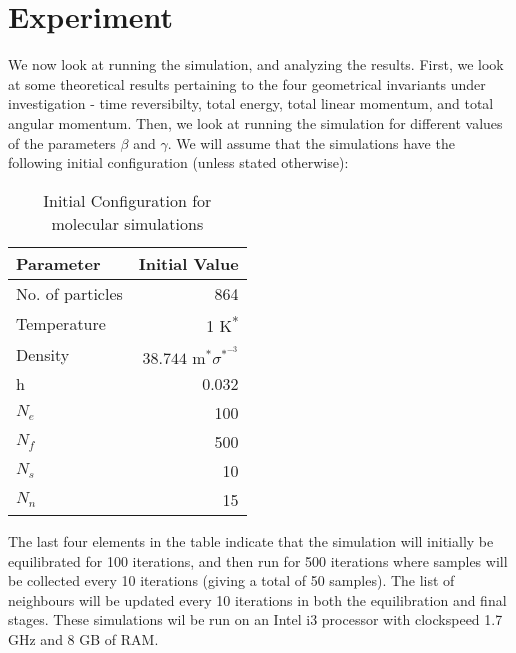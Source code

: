 \documentclass[../Main.tex]{subfiles}
\begin{document}
\section{Experiment}
We now look at running the simulation, and analyzing the results. First, we look at some theoretical results pertaining to the four geometrical invariants under investigation - time reversibilty, total energy, total linear momentum, and total angular momentum. Then, we look at running the simulation for different values of the parameters $\beta$ and $\gamma$.
We will assume that the simulations have the following initial configuration (unless stated otherwise):

\begin{table}[H]
	\centering
	\begin{tabular}{ |l|r| }
		\hline
		Parameter & Initial Value \\
		\hline
		No. of particles & 864 \\
		Temperature & 1 K\textsuperscript{*} \\
		Density & $38.744 \mbox{ m}^{*}\sigma^{*^{-3}}$ \\
		h & 0.032 \\
		$N_{e}$ & 100 \\
		$N_{f}$ & 500 \\
		$N_{s}$ & 10 \\
		$N_{n}$ & 15 \\
		\hline
	\end{tabular}
	\caption{Initial Configuration for molecular simulations}
	\label{tbl:initial_configuration_simulation}
\end{table}

The last four elements in the table indicate that the simulation will initially be equilibrated for 100 iterations, and then run for 500 iterations where samples will be collected every 10 iterations (giving a total of 50 samples). The list of neighbours will be updated every 10 iterations in both the equilibration and final stages. These simulations wil be run on an Intel i3 processor with clockspeed 1.7 GHz and 8 GB of RAM.
\end{document}
